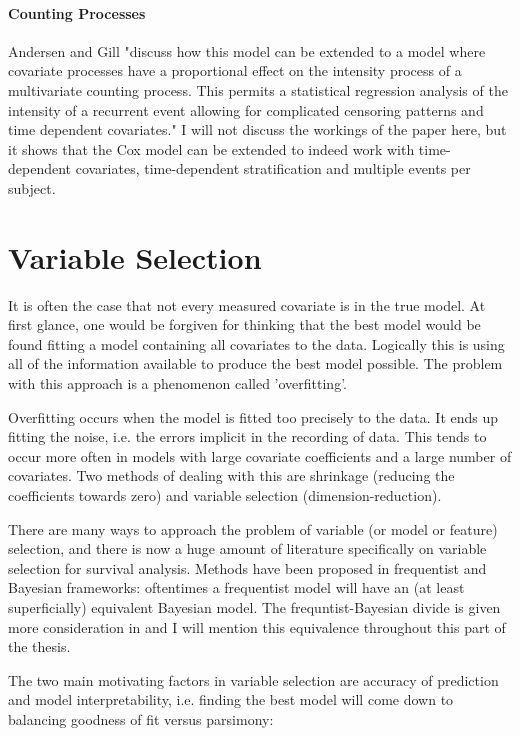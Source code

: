 \subsection{Counting Processes}

Andersen and Gill  "discuss how this model can be extended to a model where covariate processes have a proportional effect on the intensity process of a multivariate counting process. This permits a statistical regression analysis of the intensity of a recurrent event allowing for complicated censoring patterns and time dependent covariates." I will not discuss the workings of the paper here, but it shows that the Cox model can be extended to indeed work with time-dependent covariates, time-dependent stratification and multiple events per subject. 

\newpage
\part{Variable Selection}

It is often the case that not every measured covariate is in the true model. At first glance, one would be forgiven for thinking that the best model would be found fitting a model containing all covariates to the data. Logically this is using all of the information available to produce the best model possible. The problem with this approach is a phenomenon called 'overfitting'.

Overfitting occurs when the model is fitted too precisely to the data. It ends up fitting the noise, i.e. the errors implicit in the recording of data. This tends to occur more often in models with large covariate coefficients and a large number of covariates. Two methods of dealing with this are shrinkage (reducing the coefficients towards zero) and variable selection (dimension-reduction).

There are many ways to approach the problem of variable (or model or feature) selection, and there is now a huge amount of literature specifically on variable selection for survival analysis. Methods have been proposed in frequentist and Bayesian frameworks: oftentimes a frequentist model will have an (at least superficially) equivalent Bayesian model. The frequntist-Bayesian divide is given more consideration in  and I will mention this equivalence throughout this part of the thesis.

The two main motivating factors in variable selection are accuracy of prediction and model interpretability, i.e. finding the best model will come down to balancing goodness of fit versus parsimony:

